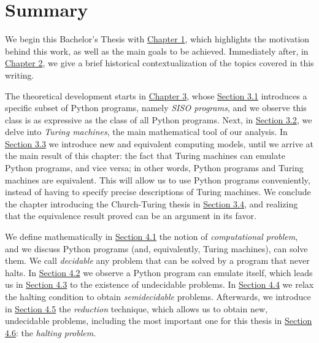 %

\chapter{Summary}



We begin this Bachelor's Thesis with \hyperref[ch:motivacion]{Chapter 1}, which highlights the motivation behind this work, as well as the main goals to be achieved. Immediately after, in \hyperref[ch:historia]{Chapter 2}, we give a brief historical contextualization of the topics covered in this writing.

The theoretical development starts in \hyperref[ch:programas-python-maquinas-turing]{Chapter 3}, whose \hyperref[sec:programas-python]{Section 3.1} introduces a specific subset of Python programs, namely \emph{SISO programs}, and we observe this class is as expressive as the class of all Python programs. Next, in \hyperref[sec:maquinas-turing]{Section 3.2}, we delve into \emph{Turing machines}, the main mathematical tool of our analysis. In \hyperref[sec:equivalencia]{Section 3.3} we introduce new and equivalent computing models, until we arrive at the main result of this chapter: the fact that Turing machines can emulate Python programs, and vice versa; in other words, Python programs and Turing machines are equivalent. This will allow us to use Python programs conveniently, instead of having to specify precise descriptions of Turing machines. We conclude the chapter introducing the Church-Turing thesis in \hyperref[sec:church-turing]{Section 3.4}, and realizing that the equivalence result proved can be an argument in its favor.

We define mathematically in \hyperref[sec:problemas-decidibles]{Section 4.1} the notion of \emph{computational problem}, and we discuss Python programs (and, equivalently, Turing machines), can solve them. We call \emph{decidable} any problem that can be solved by a program that never halts. In \hyperref[sec:universalidad]{Section 4.2} we observe a Python program can emulate itself, which leads us in \hyperref[sec:problemas-no-decidibles]{Section 4.3} to the existence of undecidable problems. In \hyperref[sec:problemas-semidecidibles]{Section 4.4} we relax the halting condition to obtain \emph{semidecidable} problems. Afterwards, we introduce in \hyperref[sec:reducciones]{Section 4.5} the \emph{reduction} technique, which allows us to obtain new, undecidable problems, including the most important one for this thesis in \hyperref[sec:problema-parada]{Section 4.6}: the \emph{halting problem}.

